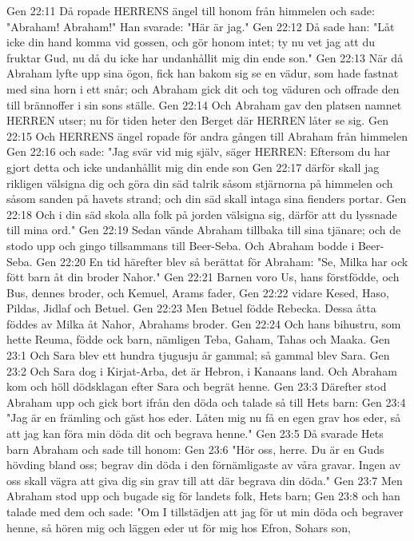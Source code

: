 Gen 22:11  Då ropade HERRENS ängel till honom från himmelen och sade: "Abraham! Abraham!" Han svarade: "Här är jag."
Gen 22:12  Då sade han: "Låt icke din hand komma vid gossen, och gör honom intet; ty nu vet jag att du fruktar Gud, nu då du icke har undanhållit mig din ende son."
Gen 22:13  När då Abraham lyfte upp sina ögon, fick han bakom sig se en vädur, som hade fastnat med sina horn i ett snår; och Abraham gick dit och tog väduren och offrade den till brännoffer i sin sons ställe.
Gen 22:14  Och Abraham gav den platsen namnet HERREN utser; nu för tiden heter den Berget där HERREN låter se sig.
Gen 22:15  Och HERRENS ängel ropade för andra gången till Abraham från himmelen
Gen 22:16  och sade: "Jag svär vid mig själv, säger HERREN: Eftersom du har gjort detta och icke undanhållit mig din ende son
Gen 22:17  därför skall jag rikligen välsigna dig och göra din säd talrik såsom stjärnorna på himmelen och såsom sanden på havets strand; och din säd skall intaga sina fienders portar.
Gen 22:18  Och i din säd skola alla folk på jorden välsigna sig, därför att du lyssnade till mina ord."
Gen 22:19  Sedan vände Abraham tillbaka till sina tjänare; och de stodo upp och gingo tillsammans till Beer-Seba. Och Abraham bodde i Beer-Seba.
Gen 22:20  En tid härefter blev så berättat för Abraham: "Se, Milka har ock fött barn åt din broder Nahor."
Gen 22:21  Barnen voro Us, hans förstfödde, och Bus, dennes broder, och Kemuel, Arams fader,
Gen 22:22  vidare Kesed, Haso, Pildas, Jidlaf och Betuel.
Gen 22:23  Men Betuel födde Rebecka. Dessa åtta föddes av Milka åt Nahor, Abrahams broder.
Gen 22:24  Och hans bihustru, som hette Reuma, födde ock barn, nämligen Teba, Gaham, Tahas och Maaka.
Gen 23:1  Och Sara blev ett hundra tjugusju år gammal; så gammal blev Sara.
Gen 23:2  Och Sara dog i Kirjat-Arba, det är Hebron, i Kanaans land. Och Abraham kom och höll dödsklagan efter Sara och begrät henne.
Gen 23:3  Därefter stod Abraham upp och gick bort ifrån den döda och talade så till Hets barn:
Gen 23:4  "Jag är en främling och gäst hos eder. Låten mig nu få en egen grav hos eder, så att jag kan föra min döda dit och begrava henne."
Gen 23:5  Då svarade Hets barn Abraham och sade till honom:
Gen 23:6  "Hör oss, herre. Du är en Guds hövding bland oss; begrav din döda i den förnämligaste av våra gravar. Ingen av oss skall vägra att giva dig sin grav till att där begrava din döda."
Gen 23:7  Men Abraham stod upp och bugade sig för landets folk, Hets barn;
Gen 23:8  och han talade med dem och sade: "Om I tillstädjen att jag för ut min döda och begraver henne, så hören mig och läggen eder ut för mig hos Efron, Sohars son,
